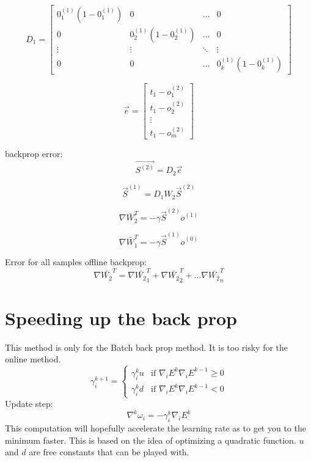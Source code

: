 \documentclass[letterpaper, 9pt]{article}
\begin{document}
\begin{equation}
D_1 =
\begin{bmatrix}
0_1^{(1)}(1 - 0_1^{(1)}) & 0 & \dots & 0 \\
0 & 0_2^{(1)}(1 - 0_2^{(1)}) & \dots & 0\\
\vdots & \vdots & \ddots & \vdots \\
0 & 0 & \dots & 0_k^{(1)}(1 - 0_k^{(1)})
\end{bmatrix}
\end{equation}

\begin{equation}
\vec{e} =
\begin{bmatrix}
t_1 - o_1^{(2)}\\
t_1 - o_2^{(2)}\\
\vdots\\
t_1 - o_m^{(2)}
\end{bmatrix}
\end{equation}

backprop error:
\begin{equation}
\vec{S^{(2)}} = D_2 \vec{e}
\end{equation}

\begin{equation}
\vec{S}^{(1)} = D_1 W_2 \vec{S}^{(2)}
\end{equation}

\begin{equation}
\nabla \bar{W}_2^T = -\gamma \vec{S}^{(2)} \hat{o}^{(1)}
\end{equation}

\begin{equation}
\nabla \bar{W}_1^T = -\gamma \vec{S}^{(1)} \hat{o}^{(0)}
\end{equation}


Error for all samples offline backprop:
\begin{equation}
\nabla \bar{W_2}^T= \nabla \bar{W_2}_1^T + \nabla \bar{W_2}_2^T + \dots  \nabla \bar{W_2}_n^T
\end{equation}

\section{Speeding up the back prop}
This method is only for the Batch back prop method. It is too risky for the online method.
\begin{equation}
\gamma_i^{k+1} =
\begin{cases}
  \gamma_i^k u & \text{if } \nabla_iE^k \nabla_iE^{k-1} \geq 0 \\
  \gamma_i^k d & \text{if } \nabla_iE^k \nabla_iE^{k-1} < 0
\end{cases}
\end{equation}
Update step:
\begin{equation}
\nabla^k \omega_i = - \gamma_i^k \nabla_i E^k
\end{equation}
This computation will hopefully accelerate the learning rate as to get you to the minimum faster. This is based on the idea of optimizing a quadratic function. $u$ and $d$ are free constants that can be played with.
\end{document}
